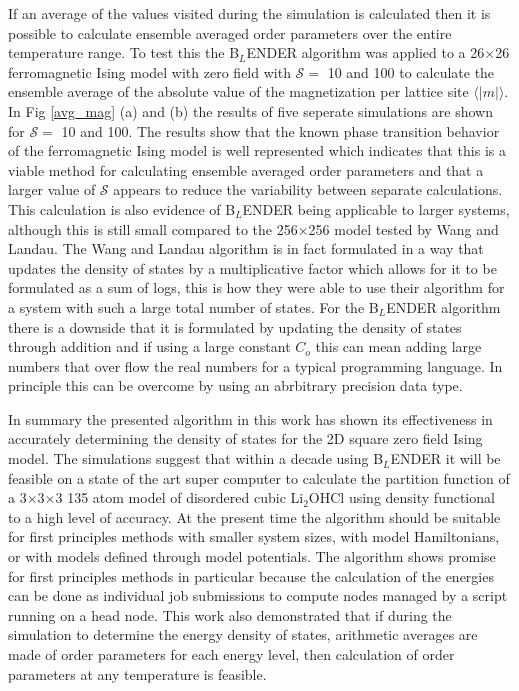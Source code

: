 \documentclass[aps,prl,reprint,superscriptaddress,showkeys]{revtex4-1}
\begin{document}
If an average of the values visited  during the simulation is calculated then it is possible to calculate ensemble averaged order parameters over the entire temperature range.  To test this the B$_L$ENDER algorithm was applied to a 26$\times$26 ferromagnetic Ising model with zero field with $\mathcal{S}=$ 10 and 100 to calculate the ensemble average of the absolute value of the magnetization per lattice site $\langle |m| \rangle$. In Fig \ref{avg_mag} (a) and (b) the results of five seperate simulations are shown for $\mathcal{S}=$ 10 and 100.  The results show that the known phase transition behavior of the ferromagnetic Ising model is well represented which indicates that this is a viable method for calculating ensemble averaged order parameters and that a larger value of $\mathcal{S}$ appears to reduce the variability between separate calculations.  This calculation is also evidence of B$_L$ENDER being applicable to larger systems, although this is still small compared to the 256$\times$256 model tested by Wang and Landau. The Wang and Landau algorithm is in fact formulated in a way that updates the  density of states by a multiplicative factor which allows for it to be formulated as a sum of logs, this is how they were able to use their algorithm for a system with such a large total number of states.  For the B$_L$ENDER algorithm there is a downside that it is formulated by updating the  density of states through addition and if using a large constant $C_o$  this can mean adding large numbers that over flow the real numbers for a typical programming language. In principle this can be overcome by using an  abrbitrary precision data type. 

In summary the presented algorithm in this work has shown its effectiveness in accurately determining the density of states for the 2D square zero field Ising model.  The simulations suggest that within a decade using B$_L$ENDER   it will be feasible on a state of the art super computer to calculate the partition function of a 3$\times$3$\times$3 135 atom model of disordered cubic Li$_2$OHCl using  density functional to a high level of accuracy. At the present time the algorithm should be suitable for first principles methods with smaller system sizes, with model Hamiltonians, or with models defined through model potentials. The algorithm shows promise for first principles methods in particular because the calculation of the energies can be done as individual job submissions to compute nodes managed by a script running on a head node. This work also demonstrated that if during the simulation to determine the energy density of states, arithmetic  averages are made of order parameters for each energy level, then calculation of order parameters at any temperature is feasible. 


\end{document}
